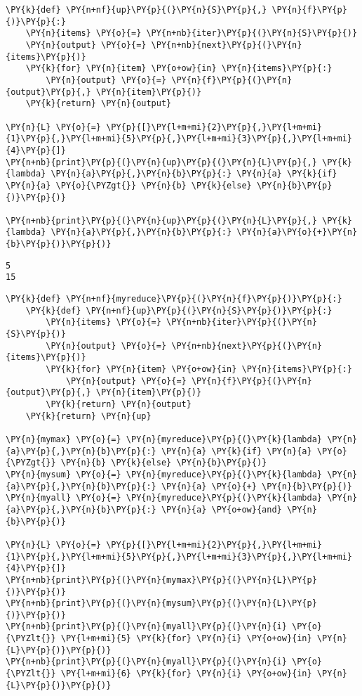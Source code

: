 \begin{Verbatim}[commandchars=\\\{\}]
\PY{k}{def} \PY{n+nf}{up}\PY{p}{(}\PY{n}{S}\PY{p}{,} \PY{n}{f}\PY{p}{)}\PY{p}{:}
    \PY{n}{items} \PY{o}{=} \PY{n+nb}{iter}\PY{p}{(}\PY{n}{S}\PY{p}{)}
    \PY{n}{output} \PY{o}{=} \PY{n+nb}{next}\PY{p}{(}\PY{n}{items}\PY{p}{)}
    \PY{k}{for} \PY{n}{item} \PY{o+ow}{in} \PY{n}{items}\PY{p}{:}
        \PY{n}{output} \PY{o}{=} \PY{n}{f}\PY{p}{(}\PY{n}{output}\PY{p}{,} \PY{n}{item}\PY{p}{)}
    \PY{k}{return} \PY{n}{output}

\PY{n}{L} \PY{o}{=} \PY{p}{[}\PY{l+m+mi}{2}\PY{p}{,}\PY{l+m+mi}{1}\PY{p}{,}\PY{l+m+mi}{5}\PY{p}{,}\PY{l+m+mi}{3}\PY{p}{,}\PY{l+m+mi}{4}\PY{p}{]}
\PY{n+nb}{print}\PY{p}{(}\PY{n}{up}\PY{p}{(}\PY{n}{L}\PY{p}{,} \PY{k}{lambda} \PY{n}{a}\PY{p}{,}\PY{n}{b}\PY{p}{:} \PY{n}{a} \PY{k}{if} \PY{n}{a} \PY{o}{\PYZgt{}} \PY{n}{b} \PY{k}{else} \PY{n}{b}\PY{p}{)}\PY{p}{)}

\PY{n+nb}{print}\PY{p}{(}\PY{n}{up}\PY{p}{(}\PY{n}{L}\PY{p}{,} \PY{k}{lambda} \PY{n}{a}\PY{p}{,}\PY{n}{b}\PY{p}{:} \PY{n}{a}\PY{o}{+}\PY{n}{b}\PY{p}{)}\PY{p}{)}
\end{Verbatim}

\begin{Verbatim}
5
15

\end{Verbatim}


\begin{Verbatim}[commandchars=\\\{\}]
\PY{k}{def} \PY{n+nf}{myreduce}\PY{p}{(}\PY{n}{f}\PY{p}{)}\PY{p}{:}
    \PY{k}{def} \PY{n+nf}{up}\PY{p}{(}\PY{n}{S}\PY{p}{)}\PY{p}{:}
        \PY{n}{items} \PY{o}{=} \PY{n+nb}{iter}\PY{p}{(}\PY{n}{S}\PY{p}{)}
        \PY{n}{output} \PY{o}{=} \PY{n+nb}{next}\PY{p}{(}\PY{n}{items}\PY{p}{)}
        \PY{k}{for} \PY{n}{item} \PY{o+ow}{in} \PY{n}{items}\PY{p}{:}
            \PY{n}{output} \PY{o}{=} \PY{n}{f}\PY{p}{(}\PY{n}{output}\PY{p}{,} \PY{n}{item}\PY{p}{)}
        \PY{k}{return} \PY{n}{output}
    \PY{k}{return} \PY{n}{up}

\PY{n}{mymax} \PY{o}{=} \PY{n}{myreduce}\PY{p}{(}\PY{k}{lambda} \PY{n}{a}\PY{p}{,}\PY{n}{b}\PY{p}{:} \PY{n}{a} \PY{k}{if} \PY{n}{a} \PY{o}{\PYZgt{}} \PY{n}{b} \PY{k}{else} \PY{n}{b}\PY{p}{)}
\PY{n}{mysum} \PY{o}{=} \PY{n}{myreduce}\PY{p}{(}\PY{k}{lambda} \PY{n}{a}\PY{p}{,}\PY{n}{b}\PY{p}{:} \PY{n}{a} \PY{o}{+} \PY{n}{b}\PY{p}{)}
\PY{n}{myall} \PY{o}{=} \PY{n}{myreduce}\PY{p}{(}\PY{k}{lambda} \PY{n}{a}\PY{p}{,}\PY{n}{b}\PY{p}{:} \PY{n}{a} \PY{o+ow}{and} \PY{n}{b}\PY{p}{)}

\PY{n}{L} \PY{o}{=} \PY{p}{[}\PY{l+m+mi}{2}\PY{p}{,}\PY{l+m+mi}{1}\PY{p}{,}\PY{l+m+mi}{5}\PY{p}{,}\PY{l+m+mi}{3}\PY{p}{,}\PY{l+m+mi}{4}\PY{p}{]}
\PY{n+nb}{print}\PY{p}{(}\PY{n}{mymax}\PY{p}{(}\PY{n}{L}\PY{p}{)}\PY{p}{)}
\PY{n+nb}{print}\PY{p}{(}\PY{n}{mysum}\PY{p}{(}\PY{n}{L}\PY{p}{)}\PY{p}{)}
\PY{n+nb}{print}\PY{p}{(}\PY{n}{myall}\PY{p}{(}\PY{n}{i} \PY{o}{\PYZlt{}} \PY{l+m+mi}{5} \PY{k}{for} \PY{n}{i} \PY{o+ow}{in} \PY{n}{L}\PY{p}{)}\PY{p}{)}
\PY{n+nb}{print}\PY{p}{(}\PY{n}{myall}\PY{p}{(}\PY{n}{i} \PY{o}{\PYZlt{}} \PY{l+m+mi}{6} \PY{k}{for} \PY{n}{i} \PY{o+ow}{in} \PY{n}{L}\PY{p}{)}\PY{p}{)}
\end{Verbatim}

